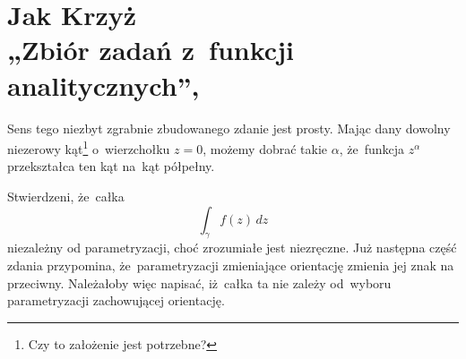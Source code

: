 \documentclass[a4paper,11pt]{article}
\numberwithin{equation}{section}
\begin{document}











\section{ %
  Jak Krzyż \\
  „Zbiór zadań z~funkcji analitycznych”,
  \cite{KrzyzZbiorZadanZFunkcjiAnalitycznych2005} }




 Sens tego niezbyt zgrabnie zbudowanego zdanie
jest prosty. Mając dany dowolny niezerowy kąt\footnote{Czy to
  założenie jest potrzebne?} o~wierzchołku $z = 0$, możemy dobrać
takie $\alpha$, że~funkcja $z^{ \alpha }$ przekształca ten kąt na~kąt półpełny.

\VerSpaceFour





 Stwierdzeni, że~całka
\begin{equation}
  \label{eq:KrzyzZZzFA-01}
  \int_{ \gamma } f( z ) \, dz
\end{equation}
niezależny od parametryzacji, choć zrozumiałe jest niezręczne. Już
następna część zdania przypomina, że~parametryzacji zmieniające
orientację zmienia jej znak na przeciwny. Należałoby więc napisać,
iż~całka ta nie zależy od~wyboru parametryzacji zachowującej
orientację.

\VerSpaceFour

















\end{document}

